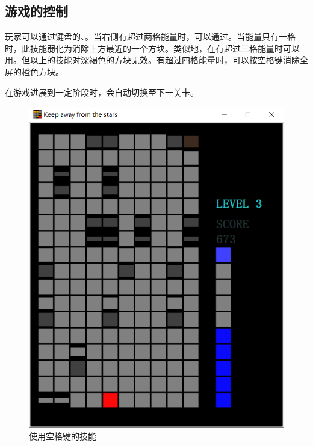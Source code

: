 \documentclass[UTF8]{article}
\begin{document}
\subsection{游戏的控制}

玩家可以通过键盘的\textleftarrow、。当右侧有超过两格能量时，可以通过。当能量只有一格时，此技能弱化为消除上方最近的一个方块。类似地，在有超过三格能量时可以用。但以上的技能对深褐色的方块无效。有超过四格能量时，可以按空格键消除全屏的橙色方块。

在游戏进展到一定阶段时，会自动切换至下一关卡。

\begin{figure}[htbp]
\centering
\begin{minipage}[t]{0.48\textwidth}
\centering
\includegraphics[scale=0.3]{fig_2.png}
\caption{使用空格键的技能}
\end{minipage}
\begin{minipage}[t]{0.48\textwidth}
\centering

\end{minipage}
\end{figure}
\end{document}
